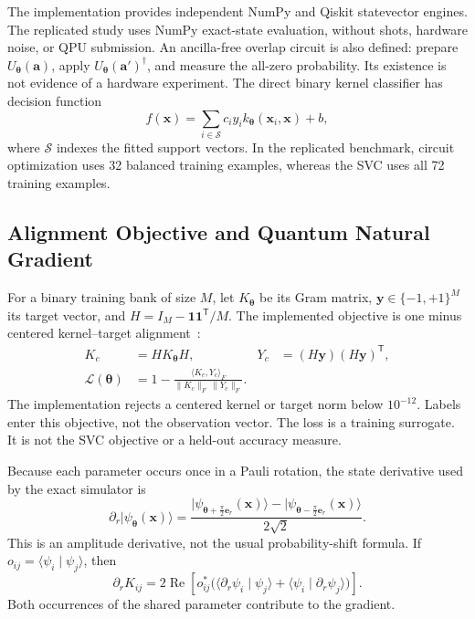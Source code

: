 The implementation provides independent NumPy and Qiskit statevector engines. The replicated study uses NumPy exact-state evaluation, without shots, hardware noise, or QPU submission. An ancilla-free overlap circuit is also defined: prepare $U_{\boldsymbol\theta}(\mathbf a)$, apply $U_{\boldsymbol\theta}(\mathbf a')^\dagger$, and measure the all-zero probability. Its existence is not evidence of a hardware experiment. The direct binary kernel classifier has decision function
\begin{equation}
 f(\mathbf x)=\sum_{i\in\mathcal S}c_i y_i
                k_{\boldsymbol\theta}(\mathbf x_i,\mathbf x)+b,
 \label{eq:kernel-svc}
\end{equation}
where $\mathcal S$ indexes the fitted support vectors. In the replicated benchmark, circuit optimization uses 32 balanced training examples, whereas the SVC uses all 72 training examples.

\subsection{Alignment Objective and Quantum Natural Gradient}
\label{sec:framework-qng}

For a binary training bank of size $M$, let $K_{\boldsymbol\theta}$ be its Gram matrix, $\mathbf y\in\{-1,+1\}^{M}$ its target vector, and $H=I_M-\mathbf1\mathbf1^{\mathsf T}/M$. The implemented objective is one minus centered kernel--target alignment~\cite{cortes2012alignment,hubregtsen2022training}:
\begin{align}
 K_c&=HK_{\boldsymbol\theta}H,
 &Y_c&=(H\mathbf y)(H\mathbf y)^{\mathsf T},\nonumber\\
 \mathcal L(\boldsymbol\theta)
   &=1-\frac{\langle K_c,Y_c\rangle_F}
                 {\|K_c\|_F\,\|Y_c\|_F}.
 \label{eq:alignment-loss}
\end{align}
The implementation rejects a centered kernel or target norm below $10^{-12}$. Labels enter this objective, not the observation vector. The loss is a training surrogate. It is not the SVC objective or a held-out accuracy measure.

Because each parameter occurs once in a Pauli rotation, the state derivative used by the exact simulator is
\begin{equation}
 \partial_r\lvert\psi_{\boldsymbol\theta}(\mathbf x)\rangle
 =\frac{
 \lvert\psi_{\boldsymbol\theta+\frac{\pi}{2}\mathbf e_r}(\mathbf x)\rangle
 -\lvert\psi_{\boldsymbol\theta-\frac{\pi}{2}\mathbf e_r}(\mathbf x)\rangle}
 {2\sqrt{2}}.
 \label{eq:state-derivative}
\end{equation}
This is an amplitude derivative, not the usual probability-shift formula. If $o_{ij}=\langle\psi_i\mid\psi_j\rangle$, then
\begin{equation}
 \partial_r K_{ij}=2\operatorname{Re}\!\left[
 o_{ij}^{*}\big(\langle\partial_r\psi_i\mid\psi_j\rangle
          +\langle\psi_i\mid\partial_r\psi_j\rangle\big)\right].
 \label{eq:kernel-derivative}
\end{equation}
Both occurrences of the shared parameter contribute to the gradient.


